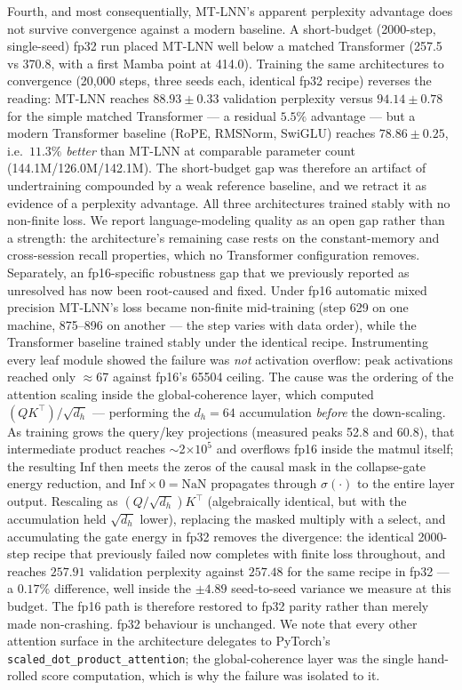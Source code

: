 \documentclass[11pt]{article}
\theoremstyle{definition}
\begin{document}
Fourth, and most consequentially, MT-LNN's apparent perplexity advantage does not survive convergence against a modern baseline. A short-budget (2000-step, single-seed) fp32 run placed MT-LNN well below a matched Transformer (257.5 vs 370.8, with a first Mamba \citep{gu2023mamba} point at 414.0). Training the same architectures to convergence (20{,}000 steps, three seeds each, identical fp32 recipe) reverses the reading: MT-LNN reaches $88.93 \pm 0.33$ validation perplexity versus $94.14 \pm 0.78$ for the simple matched Transformer --- a residual $5.5\%$ advantage --- but a modern Transformer baseline (RoPE, RMSNorm, SwiGLU) reaches $78.86 \pm 0.25$, i.e.\ $11.3\%$ \emph{better} than MT-LNN at comparable parameter count (144.1M/126.0M/142.1M). The short-budget gap was therefore an artifact of undertraining compounded by a weak reference baseline, and we retract it as evidence of a perplexity advantage. All three architectures trained stably with no non-finite loss. We report language-modeling quality as an open gap rather than a strength: the architecture's remaining case rests on the constant-memory and cross-session recall properties, which no Transformer configuration removes. Separately, an fp16-specific robustness gap that we previously reported as unresolved has now been root-caused and fixed. Under fp16 automatic mixed precision MT-LNN's loss became non-finite mid-training (step 629 on one machine, 875--896 on another --- the step varies with data order), while the Transformer baseline trained stably under the identical recipe. Instrumenting every leaf module showed the failure was \emph{not} activation overflow: peak activations reached only $\approx$67 against fp16's 65504 ceiling. The cause was the ordering of the attention scaling inside the global-coherence layer, which computed $(QK^\top)/\sqrt{d_h}$ --- performing the $d_h{=}64$ accumulation \emph{before} the down-scaling. As training grows the query/key projections (measured peaks 52.8 and 60.8), that intermediate product reaches $\sim$2$\times10^5$ and overflows fp16 inside the matmul itself; the resulting $\mathrm{Inf}$ then meets the zeros of the causal mask in the collapse-gate energy reduction, and $\mathrm{Inf}\times 0=\mathrm{NaN}$ propagates through $\sigma(\cdot)$ to the entire layer output. Rescaling as $(Q/\sqrt{d_h})K^\top$ (algebraically identical, but with the accumulation held $\sqrt{d_h}$ lower), replacing the masked multiply with a select, and accumulating the gate energy in fp32 removes the divergence: the identical 2000-step recipe that previously failed now completes with finite loss throughout, and reaches $257.91$ validation perplexity against $257.48$ for the same recipe in fp32 --- a $0.17\%$ difference, well inside the $\pm4.89$ seed-to-seed variance we measure at this budget. The fp16 path is therefore restored to fp32 parity rather than merely made non-crashing. fp32 behaviour is unchanged. We note that every other attention surface in the architecture delegates to PyTorch's \texttt{scaled\_dot\_product\_attention}; the global-coherence layer was the single hand-rolled score computation, which is why the failure was isolated to it.
\end{document}
